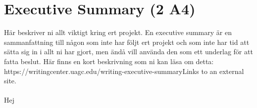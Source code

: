 \section{Executive Summary (2 A4)}
Här beskriver ni allt viktigt kring ert projekt. En executive summary är en sammanfattning till någon som inte har följt ert projekt och som inte har tid att sätta sig in i allt ni har gjort, men ändå vill använda den som ett underlag för att fatta beslut. Här finns en kort beskrivning som ni kan läsa om detta: https://writingcenter.uagc.edu/writing-executive-summaryLinks to an external site.
\\
\\
Hej
